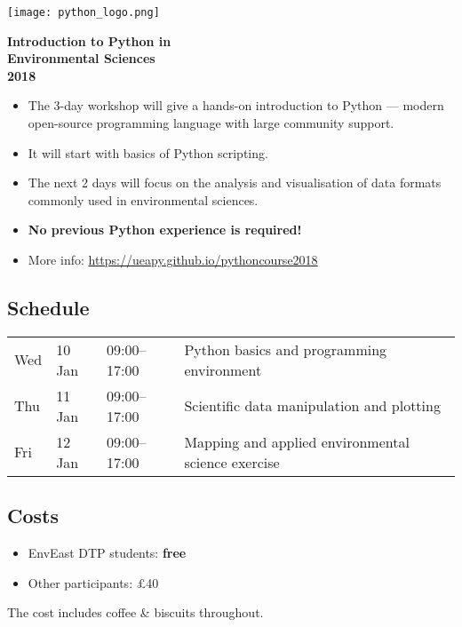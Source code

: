 \documentclass[paper=a4]{scrartcl}
\newcommand*{\pyitem}{\item [{\texttt{[image: python\_logo.png]}}]}
\begin{document}
\pagestyle{empty} %

\begin{center}
\begin{minipage}{0.2\linewidth}
    \texttt{[image: python\_logo.png]}
    \vspace{0.5cm}
\end{minipage}

\Huge \textbf{Introduction to Python in \\ Environmental Sciences \\ 2018}

\end{center}

\begin{itemize}
\pyitem The 3-day workshop will give a hands-on introduction to Python --- modern open-source programming language with large community support.
\pyitem It will start with basics of Python scripting.
\pyitem The next 2 days will focus on the analysis and visualisation of data formats commonly used in environmental sciences.
\pyitem \textbf{No previous Python experience is required!}
\pyitem More info: \url{https://ueapy.github.io/pythoncourse2018}
\end{itemize}


\subsection*{Schedule}
\begin{center}
\begin{tabular}{llll}
Wed & 10 Jan & 09:00--17:00 & Python basics and programming environment\\
Thu & 11 Jan & 09:00--17:00 & Scientific data manipulation and plotting \\
Fri & 12 Jan & 09:00--17:00 & Mapping and applied environmental science exercise\\
\end{tabular}
\end{center}


\subsection*{Costs}
\begin{itemize}
\pyitem EnvEast DTP students: \textbf{free}
\pyitem Other participants: \pounds 40
\end{itemize}
\vspace{-0.5cm}
\scriptsize The cost includes coffee \& biscuits throughout. \normalsize
\end{document}
